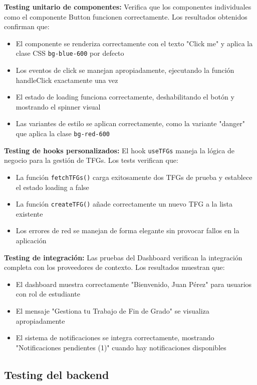 \documentclass[12pt,a4paper,oneside]{report}
\begin{document}
\textbf{Testing unitario de componentes:} Verifica que los componentes individuales como el componente Button funcionen correctamente. Los resultados obtenidos confirman que:
\begin{itemize}
\item El componente se renderiza correctamente con el texto "Click me" y aplica la clase CSS \texttt{bg-blue-600} por defecto
\item Los eventos de click se manejan apropiadamente, ejecutando la función handleClick exactamente una vez
\item El estado de loading funciona correctamente, deshabilitando el botón y mostrando el spinner visual
\item Las variantes de estilo se aplican correctamente, como la variante "danger" que aplica la clase \texttt{bg-red-600}
\end{itemize}

\textbf{Testing de hooks personalizados:} El hook \texttt{useTFGs} maneja la lógica de negocio para la gestión de TFGs. Los tests verifican que:
\begin{itemize}
\item La función \texttt{fetchTFGs()} carga exitosamente dos TFGs de prueba y establece el estado loading a false
\item La función \texttt{createTFG()} añade correctamente un nuevo TFG a la lista existente
\item Los errores de red se manejan de forma elegante sin provocar fallos en la aplicación
\end{itemize}

\textbf{Testing de integración:} Las pruebas del Dashboard verifican la integración completa con los proveedores de contexto. Los resultados muestran que:
\begin{itemize}
\item El dashboard muestra correctamente "Bienvenido, Juan Pérez" para usuarios con rol de estudiante
\item El mensaje "Gestiona tu Trabajo de Fin de Grado" se visualiza apropiadamente
\item El sistema de notificaciones se integra correctamente, mostrando "Notificaciones pendientes (1)" cuando hay notificaciones disponibles
\end{itemize}

\subsection{Testing del backend}\label{testing-del-backend}
\end{document}
